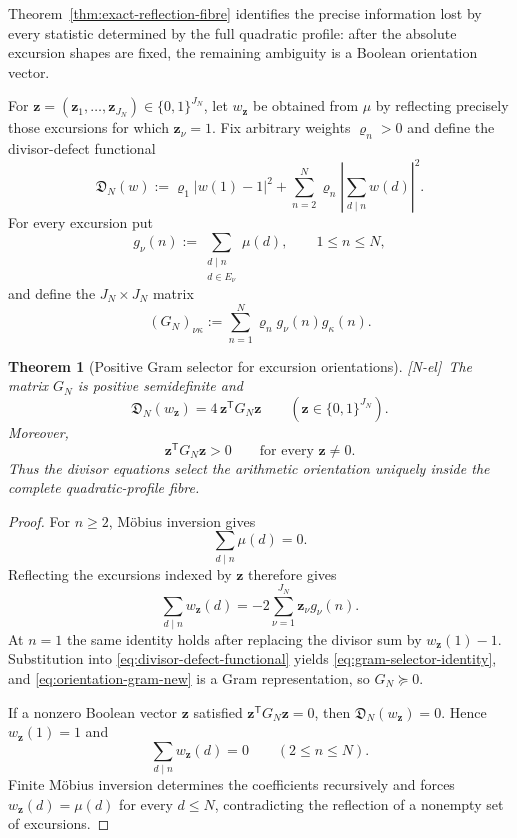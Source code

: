 \documentclass[11pt]{amsart}
\numberwithin{equation}{section}
\theoremstyle{plain}
\newtheorem{theorem}{Theorem}[section]
\theoremstyle{definition}
\theoremstyle{remark}
\newcommand{\tagNE}{\textup{[N-el]}}
\begin{document}
Theorem~\ref{thm:exact-reflection-fibre} identifies the precise information lost by every statistic determined by the full quadratic profile: after the absolute excursion shapes are fixed, the remaining ambiguity is a Boolean orientation vector.

For $\mathbf z=(\mathbf z_1,\dots,\mathbf z_{J_N})\in\{0,1\}^{J_N}$, let $w_\mathbf z$ be obtained from $\mu$ by reflecting precisely those excursions for which $\mathbf z_\nu=1$.  Fix arbitrary weights $\varrho_n>0$ and define the divisor-defect functional
\begin{equation}
\mathfrak D_N(w)
:=
\varrho_1|w(1)-1|^2
+
\sum_{n=2}^N\varrho_n
\left|\sum_{d\mid n}w(d)\right|^2.
\label{eq:divisor-defect-functional}
\end{equation}
For every excursion put
\begin{equation}
g_\nu(n):=
\sum_{\substack{d\mid n\\ d\in E_\nu}}\mu(d),
\qquad 1\le n\le N,
\label{eq:excursion-divisor-signal-new}
\end{equation}
and define the $J_N\times J_N$ matrix
\begin{equation}
(G_N)_{\nu\kappa}
:=
\sum_{n=1}^N\varrho_n g_\nu(n)g_\kappa(n).
\label{eq:orientation-gram-new}
\end{equation}

\begin{theorem}[Positive Gram selector for excursion orientations]
\label{thm:positive-gram-selector}
\tagNE\ The matrix $G_N$ is positive semidefinite and
\begin{equation}
\mathfrak D_N(w_\mathbf z)
=
4\,\mathbf z^{\mathsf T}G_N\mathbf z
\qquad
(\mathbf z\in\{0,1\}^{J_N}).
\label{eq:gram-selector-identity}
\end{equation}
Moreover,
\begin{equation}
\mathbf z^{\mathsf T}G_N\mathbf z>0
\qquad\text{for every }\mathbf z\ne0.
\label{eq:boolean-strict-positivity}
\end{equation}
Thus the divisor equations select the arithmetic orientation uniquely inside the complete quadratic-profile fibre.
\end{theorem}

\begin{proof}
For $n\ge2$, M\"obius inversion gives
\[
\sum_{d\mid n}\mu(d)=0.
\]
Reflecting the excursions indexed by $\mathbf z$ therefore gives
\[
\sum_{d\mid n}w_\mathbf z(d)
=-2\sum_{\nu=1}^{J_N}\mathbf z_\nu g_\nu(n).
\]
At $n=1$ the same identity holds after replacing the divisor sum by $w_\mathbf z(1)-1$.  Substitution into \eqref{eq:divisor-defect-functional} yields \eqref{eq:gram-selector-identity}, and \eqref{eq:orientation-gram-new} is a Gram representation, so $G_N\succeq0$.

If a nonzero Boolean vector $\mathbf z$ satisfied $\mathbf z^{\mathsf T}G_N\mathbf z=0$, then $\mathfrak D_N(w_\mathbf z)=0$.  Hence $w_\mathbf z(1)=1$ and
\[
\sum_{d\mid n}w_\mathbf z(d)=0\qquad(2\le n\le N).
\]
Finite M\"obius inversion determines the coefficients recursively and forces $w_\mathbf z(d)=\mu(d)$ for every $d\le N$, contradicting the reflection of a nonempty set of excursions.
\end{proof}
\end{document}
